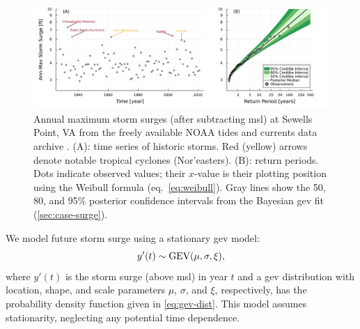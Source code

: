 \documentclass{agujournal2019}
\begin{document}
\begin{figure}
  \centering
  \includegraphics[width=\textwidth]{surge-obs-return}
  \caption{
    Annual maximum storm surges (after subtracting \acrlong{msl}) at Sewells Point, VA from the freely available NOAA tides and currents data archive \protect\cite{noaa_tidesandcurrents:2022}.
    (A):
    time series of historic storms.
    Red (yellow) arrows denote notable tropical cyclones (Nor'easters).
    (B):
    return periods.
    Dots indicate observed values; their $x$-value is their plotting position using the Weibull formula (eq.~\ref{eq:weibull}).
    Gray lines show the 50, 80, and 95\% posterior confidence intervals from the Bayesian \gls{gev} fit (\cref{sec:case-surge}).
  }\label{fig:surge-obs-return}
\end{figure}

We model future storm surge using a stationary \gls{gev} model:
\begin{equation}\label{eq:surge-model}
  y'(t) \sim \text{GEV}\qty(\mu, \sigma, \xi),
\end{equation}
where $y'(t)$ is the storm surge (above \gls{msl}) in year $t$ and a \gls{gev} distribution with location, shape, and scale parameters $\mu$, $\sigma$, and $\xi$, respectively, has the probability density function given in \cref{eq:gev-dist}.
This model assumes stationarity, neglecting any potential time dependence.
\end{document}
